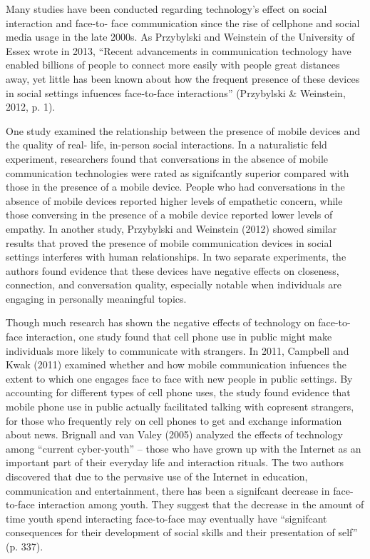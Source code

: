 \documentclass[11pt]{article} %
\begin{document}
Many studies have been conducted regarding technology’s effect on social interaction and face-to-
face communication since the rise of cellphone and social media usage in the late 2000s. As Przybylski and 
Weinstein of the University of Essex wrote in 2013, “Recent advancements in communication technology 
have enabled billions of people to connect more easily with people great distances away, yet little has been 
known about how the frequent presence of these devices in social settings infuences face-to-face interactions” (Przybylski & Weinstein, 2012, p. 1).

One study examined the relationship between the presence of mobile devices and the quality of real-
life, in-person social interactions. In a naturalistic feld experiment, researchers found that conversations in 
the absence of mobile communication technologies were rated as signifcantly superior compared with those 
in the presence of a mobile device. People who had conversations in the absence of mobile devices reported higher levels of empathetic concern, while those conversing in the presence of a mobile device reported lower levels of empathy. 
In another study, Przybylski and Weinstein (2012) showed similar results that proved the presence of 
mobile communication devices in social settings interferes with human relationships. In two separate experiments, the authors found evidence that these devices have negative effects on closeness, connection, and 
conversation quality, especially notable when individuals are engaging in personally meaningful topics.  

Though much research has shown the negative effects of technology on face-to-face interaction, one 
study found that cell phone use in public might make individuals more likely to communicate with strangers. 
In 2011, Campbell and Kwak (2011) examined whether and how mobile communication infuences the extent 
to which one engages face to face with new people in public settings. By accounting for different types of cell 
phone uses, the study found evidence that mobile phone use in public actually facilitated talking with copresent strangers, for those who frequently rely on cell phones to get and exchange information about news.
Brignall and van Valey (2005) analyzed the effects of technology among “current cyber-youth” – those 
who have grown up with the Internet as an important part of their everyday life and interaction rituals. The two 
authors discovered that due to the pervasive use of the Internet in education, communication and entertainment, there has been a signifcant decrease in face-to-face interaction among youth. They suggest that the 
decrease in the amount of time youth spend interacting face-to-face may eventually have “signifcant consequences for their development of social skills and their presentation of self” (p. 337). 
\end{document}
